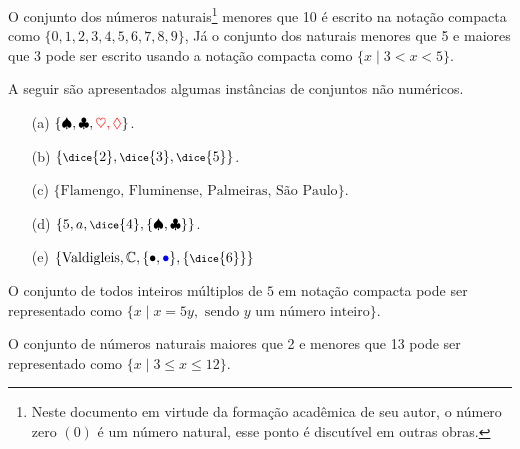 \begin{exemplo}\label{exe:SetBuilder1}
  O conjunto dos números naturais\footnote{Neste documento em virtude da formação acadêmica de seu autor, o número zero $(0)$ é um número natural, esse ponto é discutível em outras obras.} menores que 10 é escrito na notação compacta como  $\{0, 1, 2, 3, 4, 5, 6, 7, 8, 9\}$, Já o conjunto dos naturais menores que 5 e maiores que 3 pode ser escrito usando a notação compacta como $\{x \mid 3 < x < 5\}$.
\end{exemplo}

\begin{exemplo}\label{exe:SetBuilder2}
  A seguir são apresentados algumas instâncias de conjuntos não numéricos.
  \begin{itemize}
    \item[(a)] $\{\spadesuit, \clubsuit, {\color{red} \heartsuit, \lozenge}\}$.
    \item[(b)] $\{{\footnotesize \dice{2}, \dice{3}, \dice{5}}\}$.
    \item[(c)] $\{\mbox{Flamengo, Fluminense, Palmeiras, São Paulo}\}$.
    \item[(d)] $\{5, a, {\footnotesize\dice{4}}, \{\spadesuit, \clubsuit\}\}$.
    \item[(e)] $\{\text{Valdigleis}, \mathbb{C}, \{\bullet, {\color{blue}\bullet}\}, \{{\footnotesize\dice{6}} \}\}$
  \end{itemize}
\end{exemplo}

\begin{exemplo}\label{exe:SetBuilder3}
  O conjunto de todos inteiros múltiplos de $5$ em notação compacta pode ser representado como $\{x \mid x = 5y, \text{ sendo $y$ um número inteiro}\}$.
\end{exemplo}

\begin{exemplo}\label{exe:SetBuilder4}
  O conjunto de números naturais maiores que 2 e menores que 13 pode ser representado como  $\{x \mid 3 \leq x \leq 12\}$.
\end{exemplo}

